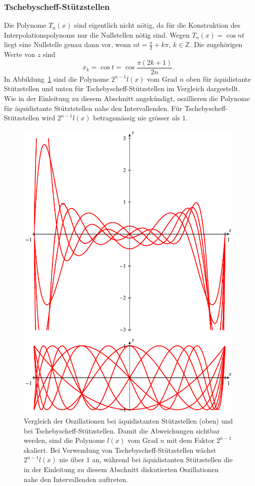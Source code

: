 \subsubsection{Tschebyscheff-Stützstellen}
%
Die Polynome $T_n(x)$ sind eigentlich nicht nötig, da für die Konstruktion
des Interpolationspolynoms nur die Nullstellen nötig sind.
Wegen $T_n(x)=\cos nt$ liegt eine Nullstelle genau dann vor, wenn
$nt = \frac{\pi}2 + k\pi$, $k\in\mathbb Z$.
Die zugehörigen Werte von $z$ sind
\[
x_k
=
\cos t = \cos\frac{\pi(2k+1)}{2n}.
\]
In Abbildung~\ref{buch:figure:tschebyscheff-vergleich} sind 
die Polynome $2^{n-1}l(x)$ vom Grad $n$ oben für äquidistante Stützstellen
und unten für Tschebyscheff-Stützstellen im Vergleich dargestellt.
Wie in der Einleitung zu diesem Abschnitt angekündigt, oszillieren die
Polynome für äquidistante Stütztstellen nahe den Intervallenden.
%
Für Tschebyscheff-Stützstellen wird $2^{n-1}l(x)$ betragsmässig nie
grösser als $1$.
\begin{figure}
\centering
\includegraphics{chapters/30-interpolation/figures/vergleich.pdf}
\caption{Vergleich der Oszillationen bei äquidistanten Stützstellen (oben)
und bei Tschebyscheff-Stützstellen.
Damit die Abweichungen sichtbar werden, sind die Polynome $l(x)$ vom Grad
$n$ mit dem Faktor $2^{n-1}$ skaliert.
Bei Verwendung von Tscheby\-scheff-Stützstellen wächst $2^{n-1}l(x)$
nie über $1$ an, während bei äquidistanten Stützstellen die in der
Einleitung zu diesem Abschnitt diskutierten Oszillationen nahe den
Intervallenden auftreten.
\label{buch:figure:tschebyscheff-vergleich}}
\end{figure}

